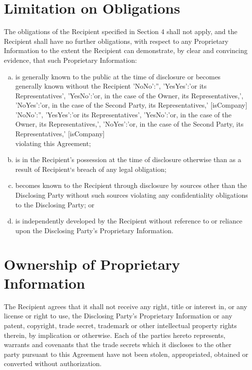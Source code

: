 \documentclass[8pt]{article}
\makeatletter
\edef\history{ }
\newcommand{\VAR}[1]{{\color{blue} #1}\g@addto@macro\history{#1\\}}
\newcommand{\representativesMention}[1]{
    \VAR{
        {
            'NoNo':'',
            'YesYes':'#1 its Representatives',
            'YesNo':'#1, in the case of the Owner, its Representatives,',
            'NoYes':'#1, in the case of the Second Party, its Representatives,'
        }[isCompany]
    }
}
\makeatother
\begin{document}
\section{Limitation on Obligations} \label{sec:limitOblig}
The obligations of the Recipient specified in Section 4 shall not apply, and the Recipient shall have no further obligations, with respect to any Proprietary Information to the extent the Recipient can demonstrate, by clear and convincing evidence, that such Proprietary Information:
\begin{enumerate}[a)]
\item is generally known to the public at the time of disclosure or becomes generally known without the Recipient \representativesMention{or} violating this Agreement;
\item  is in the Recipient’s possession at the time of disclosure otherwise than as a result of Recipient`s breach of any legal obligation;
\item becomes known to the Recipient through disclosure by sources other than the Disclosing Party without such sources violating any confidentiality obligations to the Disclosing Party; or
\item is independently developed by the Recipient without reference to or reliance upon the Disclosing Party's Proprietary Information.
\end{enumerate}

\section{Ownership of Proprietary Information}
The Recipient agrees that it shall not receive any right, title or interest in, or any license or right to use, the Disclosing Party's Proprietary Information or any patent, copyright, trade secret, trademark or other intellectual property rights therein, by implication or otherwise.
Each of the parties hereto represents, warrants and covenants that the trade secrets which it discloses to the other party pursuant to this Agreement have not been stolen, appropriated, obtained or converted without authorization.
\end{document}
